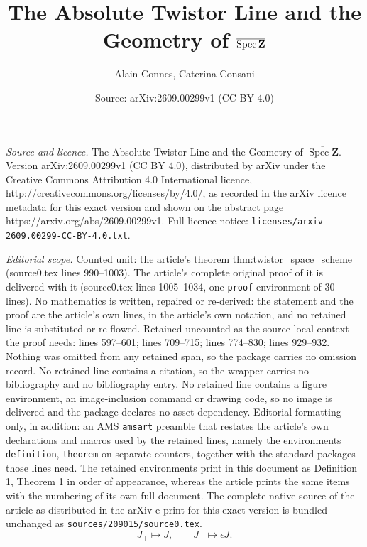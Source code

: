 \documentclass[10pt,a4paper]{amsart}
\title{\Large The Absolute Twistor Line and the Geometry of $\overline{\Spec\Z}$}
\author{Alain Connes, Caterina Consani}
\date{Source: arXiv:2609.00299v1 (CC BY 4.0)}
\newcommand{\Z}{\mathbf{Z}}
\newcommand{\Spec}{\operatorname{Spec}}
\begin{document}
\maketitle

\noindent\emph{Source and licence.} \Large The Absolute Twistor Line and the Geometry of $\overline{\Spec\Z}$. Version arXiv:2609.00299v1 (CC BY 4.0), distributed by arXiv under the Creative Commons Attribution 4.0 International licence, http://creativecommons.org/licenses/by/4.0/, as recorded in the arXiv licence metadata for this exact version and shown on the abstract page https://arxiv.org/abs/2609.00299v1. Full licence notice: \texttt{licenses/arxiv-2609.00299-CC-BY-4.0.txt}.\par\smallskip

\noindent\textit{Editorial scope.} Counted unit: the article's theorem thm:twistor\_space\_scheme (source0.tex lines 990--1003). The article's complete original proof of it is delivered with it (source0.tex lines 1005--1034, one \texttt{proof} environment of 30 lines). No mathematics is written, repaired or re-derived: the statement and the proof are the article's own lines, in the article's own notation, and no retained line is substituted or re-flowed.  Retained uncounted as the source-local context the proof needs: lines 597--601; lines 709--715; lines 774--830; lines 929--932.  Nothing was omitted from any retained span, so the package carries no omission record.  No retained line contains a citation, so the wrapper carries no bibliography and no bibliography entry.  No retained line contains a figure environment, an image-inclusion command or drawing code, so no image is delivered and the package declares no asset dependency.  Editorial formatting only, in addition: an AMS \texttt{amsart} preamble that restates the article's own declarations and macros used by the retained lines, namely the environments \texttt{definition}, \texttt{theorem} on separate counters, together with the standard packages those lines need.  The retained environments print in this document as Definition 1, Theorem 1 in order of appearance, whereas the article prints the same items with the numbering of its own full document.  The complete native source of the article as distributed in the arXiv e-print for this exact version is bundled unchanged as \texttt{sources/209015/source0.tex}.
\begin{equation}\label{eq:restriction_maps}
J_+\longmapsto J,
\qquad
J_-\longmapsto\epsilon J.
\end{equation}
\end{document}
